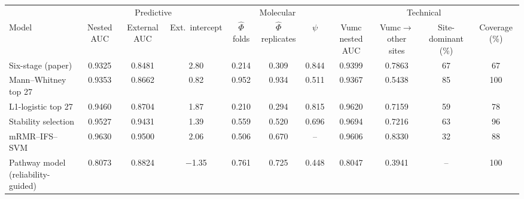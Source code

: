 \begin{tabular}{l ccc ccc cccc}
\toprule
 & \multicolumn{3}{c}{Predictive} & \multicolumn{3}{c}{Molecular} & \multicolumn{4}{c}{Technical} \\
\cmidrule(lr){2-4}\cmidrule(lr){5-7}\cmidrule(lr){8-11}
Model & Nested AUC & External AUC & Ext.\ intercept & $\hat\Phi$ folds & $\hat\Phi$ replicates & $\psi$ & Vumc nested AUC & Vumc$\rightarrow$other sites & Site-dominant (\%) & Coverage (\%) \\
\midrule
Six-stage (paper) & 0.9325 & 0.8481 & 2.80 & 0.214 & 0.309 & 0.844 & 0.9399 & 0.7863 & 67 & 67 \\
Mann--Whitney top 27 & 0.9353 & 0.8662 & 0.82 & 0.952 & 0.934 & 0.511 & 0.9367 & 0.5438 & 85 & 100 \\
L1-logistic top 27 & 0.9460 & 0.8704 & 1.87 & 0.210 & 0.294 & 0.815 & 0.9620 & 0.7159 & 59 & 78 \\
Stability selection & 0.9527 & 0.9431 & 1.39 & 0.559 & 0.520 & 0.696 & 0.9694 & 0.7216 & 63 & 96 \\
mRMR--IFS--SVM & 0.9630 & 0.9500 & 2.06 & 0.506 & 0.670 & -- & 0.9606 & 0.8330 & 32 & 88 \\
\midrule
Pathway model (reliability-guided) & 0.8073 & 0.8824 & $-$1.35 & 0.761 & 0.725 & 0.448 & 0.8047 & 0.3941 & -- & 100 \\
\bottomrule
\end{tabular}
